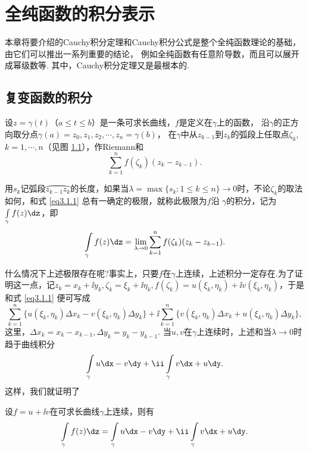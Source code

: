 \setcounter{chapter}{2}
\chapter{全纯函数的积分表示\label{chap3}}

本章将要介绍的Cauchy积分定理和Cauchy积分公式是整个全纯函数理论的基础，由它们可以推出一系列重要的结论，
例如全纯函数有任意阶导数，而且可以展开成幂级数等. 其中，Cauchy积分定理又是最根本的.


\section{复变函数的积分\label{sec3.1}}

设$z=\gamma(t)$（$a\le t\le b$）是一条可求长曲线，$f$是定义在$\gamma$上的函数，
沿$\gamma$的正方向取分点$\gamma(a)=z_0,z_1,z_2,\cdots,z_n=\gamma(b)$，
在$\gamma$中从$z_{k-1}$到$z_k$的弧段上任取点$\zeta_k$, $k=1,\cdots,n$（见图 \ref{fig3.1}），作Riemann和
\begin{equation}\label{eq3.1.1}
\sum_{k=1}^nf(\zeta_k)(z_k-z_{k-1}).
\end{equation}
\begin{figure}[!ht]
\centering
{}
\caption{\label{fig3.1}}
\end{figure}
用$s_k$记弧段$\wideparen{z_{k-1}z_k}$的长度，如果当$\lambda=\max\{s_k:1\le k\le n\}\to0$时，不论$\zeta_k$的取法如何，和式 \eqref{eq3.1.1} 总有一确定的极限，就称此极限为$f$沿
$\gamma$的积分，记为$\int\limits_\gamma f(z)\dz$，即
\[\int\limits_\gamma f(z)\dz=\lim_{\lambda\to0}\sum_{k=1}^nf(\zeta_k)(z_k-z_{k-1}).\]

什么情况下上述极限存在呢?事实上，只要$f$在$\gamma$上连续，上述积分一定存在.为了证明这一点，记$z_k=x_k+\ii y_k,\zeta_k=\xi_k+\ii\eta_k,f(\zeta_k)=u(\xi_k,\eta_k)+\ii v(\xi_k,\eta_k)$，于是和式 \eqref{eq3.1.1} 便可写成
\[\sum_{k=1}^n\{u(\xi_k,\eta_k)\Delta x_k-v(\xi_k,\eta_k)\Delta y_k\}
+\ii\sum_{k=1}^n\{v(\xi_k,\eta_k)\Delta x_k+u(\xi_k,\eta_k)\Delta y_k\},\]
这里，$\Delta x_k=x_k-x_{k-1},\Delta y_k=y_k-y_{k-1}$. 当$u,v$在$\gamma$上连续时，上述和当$\lambda\to0$时趋于曲线积分
\[\int\limits_\gamma u\dx-v\dy+\ii\int\limits_\gamma v\dx+u\dy.\]
这样，我们就证明了
\begin{prop}\label{prop3.1.1}
设$f=u+\ii v$在可求长曲线$\gamma$上连续，则有
\begin{equation}\label{eq3.1.2}
\int\limits_\gamma f(z)\dz=\int\limits\limits_\gamma u\dx-v\dy+\ii\int\limits_\gamma v\dx+u\dy.
\end{equation}
\end{prop}

